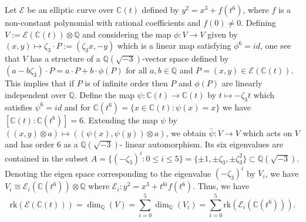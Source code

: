 \documentclass[11pt]{amsart}
\newcommand{\Q}{{\mathbb Q}}
\newcommand{\CC}{{\mathbb C}}
\newcommand{\Ee}{{\mathcal E}}
\newcommand{\rk}{{\text{rk}}}
\numberwithin{equation}{section}
\numberwithin{table}{section}
\newcommand\<{\langle}
\begin{document}
Let $\Ee$ be an elliptic curve over $\CC(t)$ defined by 
$y^2=x^3+ f(t^6)$, where $f$ is a non-constant polynomial  with rational coefficients and $f(0)\neq 0$. Defining
$V:=\Ee(\CC(t)) \otimes \Q$  and  considering the map
$\phi: V \rightarrow V$ given by 
$(x, y) \mapsto \zeta_3 \cdot P := (\zeta_3 x, - y)$
which	is a linear map satisfying $\phi^6=id$,  one see that $V$ has a structure of  a $\Q(\sqrt{-3})$-vector space defined by
$(a-b  \zeta_3)\cdot P= a \cdot P + b \cdot \phi(P)$ for all $a, b \in \Q$ and $P=(x,y) \in \Ee(\CC(t)).$ This implies that if $P$ is of infinite order then
$P$ and $\phi(P) $ are linearly independent over $\Q$. 
Define the map $\psi: \CC(t) \rightarrow \CC(t)$ by $t\mapsto - \zeta_3  t$ which satisfies $\psi^6=id$ and for $\CC(t^6)=\{ x\in \CC(t): \psi(x)=x\}$  we have 
$[\CC(t): \CC(t^6)]=6$. Extending the map $\psi$ by 
$((x, y)\otimes a) \mapsto ((\psi(x), \psi(y))\otimes a)$,
we obtain 
$\bar{\psi}: V \rightarrow V$   which acts on $V$ and 
has order $6$  as a $\Q(\sqrt{-3})$- linear automorphism.
Its six eigenvalues are contained in the subset
$A=\{(-\zeta_3)^i:   0 \leq i \leq 5\}=\{\pm 1, \pm \zeta_3, \pm \zeta_3^2 \} \subset \Q(\sqrt{-3}).$
Denoting  the eigen space corresponding to the eigenvalue $(-\zeta_3)^i$ by $V_i$, we have
$V_i \cong \Ee_i(\CC(t^6))\otimes \Q $ where $ \Ee_i: y^2=x^3+ t^{6 i} f(t^6)$.
Thus, we have 
$$\rk (\Ee(\CC(t))) =\dim_\Q(V)=\sum_{i=0}^{5} \dim_\Q(V_i)=
\sum_{i=0}^5 \rk (\Ee_i(\CC(t^6))).$$
\end{document}
